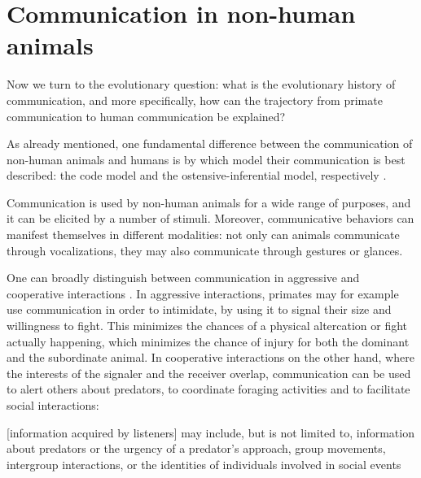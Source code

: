 \section{Communication in non-human animals}
\label{sec:comm:phylogeny}


Now we turn to the evolutionary question: what is the evolutionary history of communication, and more specifically, how can the trajectory from primate communication to human communication be explained?

As already mentioned, one fundamental difference between the communication of non-human animals and humans is by which model their communication is best described: the code model and the ostensive-inferential model, respectively \citep{Scott-Phillips15-primate, Scott-Phillips18-communication}.

Communication is used by non-human animals for a wide range of purposes, and it can be elicited by a number of stimuli. Moreover, communicative behaviors can manifest themselves in different modalities: not only can animals communicate through vocalizations, they may also communicate through gestures or glances.

One can broadly distinguish between communication in aggressive and cooperative interactions \citep{SeyfarthCheney03}. In aggressive interactions, primates may for example use communication in order to intimidate, by using it to signal their size and willingness to fight. This minimizes the chances of a physical altercation or fight actually happening, which minimizes the chance of injury for both the dominant and the subordinate animal.
In cooperative interactions on the other hand, where the interests of the signaler and the receiver overlap, communication can be used to alert others about predators, to coordinate foraging activities and to facilitate social interactions:
\begin{quoting}
    {[information acquired by listeners]} may include, but is not limited to, information about predators or the urgency of a predator’s approach, group movements, intergroup interactions, or the identities of individuals involved in social events
    \hfill \citep[p.~168]{SeyfarthCheney03}
\end{quoting}

